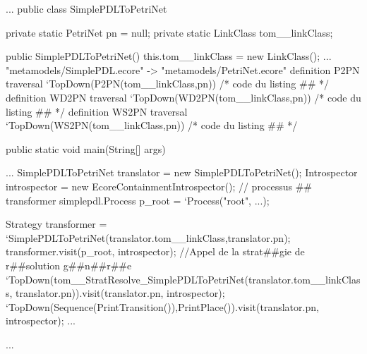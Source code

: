 \begin{tomcode3}[caption=Forme générale du code de la transformation \emph{SimplePDLToPetriNet},label=code:transfoLightSimplePDL2PN]
...
public class SimplePDLToPetriNet {


  private static PetriNet pn = null;
  private static LinkClass tom__linkClass;

  public SimplePDLToPetriNet() {
    this.tom__linkClass = new LinkClass();
  }
 ...
             "metamodels/SimplePDL.ecore" -> "metamodels/PetriNet.ecore" {
    definition P2PN traversal `TopDown(P2PN(tom__linkClass,pn)) {
      /* code du listing ## */
    }
    definition WD2PN traversal `TopDown(WD2PN(tom__linkClass,pn)) {
      /* code du listing ## */
    }
    definition WS2PN traversal `TopDown(WS2PN(tom__linkClass,pn)) {
      /* code du listing ## */
    }
  }

  public static void main(String[] args) {
    ...
    SimplePDLToPetriNet translator = new SimplePDLToPetriNet();
    Introspector introspector = new EcoreContainmentIntrospector();
    // processus ## transformer
    simplepdl.Process p_root = `Process("root", ...);

    Strategy transformer = 
             `SimplePDLToPetriNet(translator.tom__linkClass,translator.pn);
    transformer.visit(p_root, introspector);
    //Appel de la strat##gie de r##solution g##n##r##e
    `TopDown(tom__StratResolve_SimplePDLToPetriNet(translator.tom__linkClass,
                             translator.pn)).visit(translator.pn, introspector);
    `TopDown(Sequence(PrintTransition()),PrintPlace()).visit(translator.pn,
                                                                    introspector);
    ...
  }
  ...
}
\end{tomcode3}
